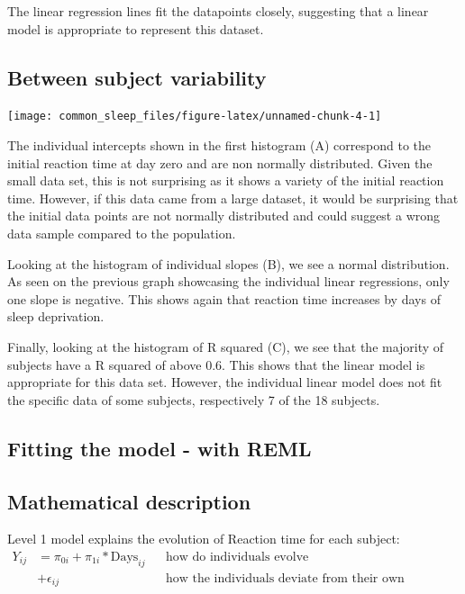 \documentclass[
]{article}
\begin{document}
The linear regression lines fit the datapoints closely, suggesting that
a linear model is appropriate to represent this dataset.

\hypertarget{between-subject-variability}{%
\subsection{Between subject
variability}\label{between-subject-variability}}

\begin{center}\texttt{[image: common\_sleep\_files/figure-latex/unnamed-chunk-4-1]} \end{center}

The individual intercepts shown in the first histogram (A) correspond to
the initial reaction time at day zero and are non normally distributed.
Given the small data set, this is not surprising as it shows a variety
of the initial reaction time. However, if this data came from a large
dataset, it would be surprising that the initial data points are not
normally distributed and could suggest a wrong data sample compared to
the population.

Looking at the histogram of individual slopes (B), we see a normal
distribution. As seen on the previous graph showcasing the individual
linear regressions, only one slope is negative. This shows again that
reaction time increases by days of sleep deprivation.

Finally, looking at the histogram of R squared (C), we see that the
majority of subjects have a R squared of above 0.6. This shows that the
linear model is appropriate for this data set. However, the individual
linear model does not fit the specific data of some subjects,
respectively 7 of the 18 subjects.

\hypertarget{fitting-the-model---with-reml}{%
\subsection{Fitting the model - with
REML}\label{fitting-the-model---with-reml}}

\hypertarget{mathematical-description}{%
\subsection{Mathematical description}\label{mathematical-description}}

Level 1 model explains the evolution of Reaction time for each subject:
\[\begin{aligned}
Y_{ij}&= \pi_{0i} + \pi_{1i}* \text{Days}_{ij} && \text{how do individuals evolve} \\
          &+ \epsilon_{ij} &&\text{how the individuals deviate from their own evolution}
\end{aligned} \tag{2}\]
\end{document}
